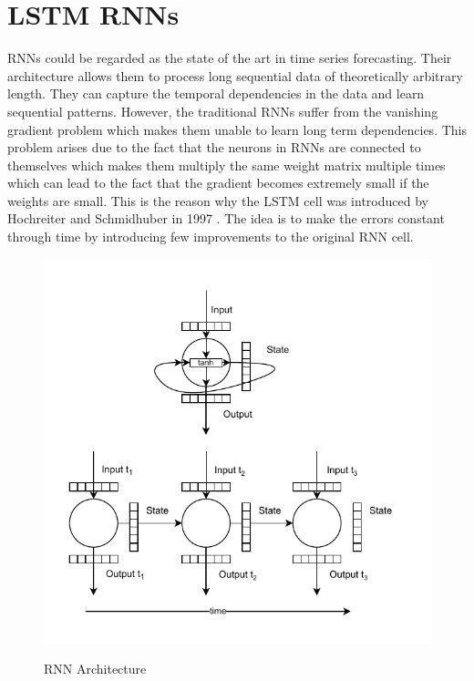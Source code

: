 \section{\acl{LSTM} \acl{RNN}s}

\acl{RNN}s could be regarded as the state of the art in time series forecasting.
Their architecture allows them to process long sequential data
of theoretically arbitrary length. They can capture the temporal dependencies
in the data and learn sequential patterns. However, the traditional \ac{RNN}s
suffer from the vanishing gradient problem which makes them unable to learn 
long term dependencies. This problem arises
due to the fact that the neurons in \ac{RNN}s are connected to themselves
which makes them multiply the same weight matrix multiple
times which can lead to the fact that the gradient becomes extremely small if the 
weights are small. This is the reason why the \ac{LSTM} cell was
introduced by Hochreiter and Schmidhuber in 1997 \cite{Hochreiter1997}.
The idea is to make the errors constant through time by introducing few improvements
to the original \ac{RNN} cell.

\begin{figure}[!h]
    \centering
    \caption{\acl{RNN} Architecture}
        \includegraphics[width=1\textwidth]{Figures/RNN.drawio.pdf}
    \label{fig:rnn_architecture}
\end{figure}

